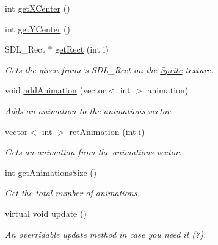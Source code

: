 \begin{DoxyCompactItemize}
int \hyperlink{class_sprite_a2863e4b0262fc2039a9dec95659fafc2}{get\-X\-Center} ()
\item 
int \hyperlink{class_sprite_ab7f9b251c7f95b8bbf7fc7d04038d477}{get\-Y\-Center} ()
\item 
S\-D\-L\-\_\-\-Rect $\ast$ \hyperlink{class_sprite_a8da8cdca88b50b2cf61bc9cd43a6c986}{get\-Rect} (int i)
\begin{DoxyCompactList}\small\item\em Gets the given frame's S\-D\-L\-\_\-\-Rect on the \hyperlink{class_sprite}{Sprite} texture. \end{DoxyCompactList}\item 
void \hyperlink{class_sprite_a7b6f244a3fcaa271d16b9c690c486c77}{add\-Animation} (vector$<$ int $>$ animation)
\begin{DoxyCompactList}\small\item\em Adds an animation to the animations vector. \end{DoxyCompactList}\item 
vector$<$ int $>$ \hyperlink{class_sprite_a6c29474804466ae43d379ec17885044a}{ret\-Animation} (int i)
\begin{DoxyCompactList}\small\item\em Gets an animation from the animations vector. \end{DoxyCompactList}\item 
int \hyperlink{class_sprite_a6f3e4a0efcff7c0ee234655c8a0ae80e}{get\-Animations\-Size} ()
\begin{DoxyCompactList}\small\item\em Get the total number of animations. \end{DoxyCompactList}\item 
virtual void \hyperlink{class_sprite_a6d0f7e628b4ea8540697605fff906759}{update} ()
\begin{DoxyCompactList}\small\item\em An overridable update method in case you need it (?). \end{DoxyCompactList}\end{DoxyCompactItemize}
